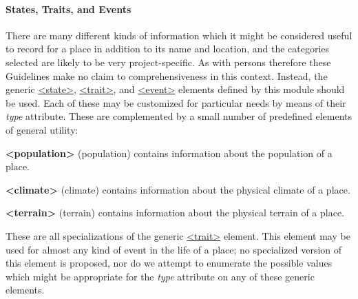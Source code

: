 \paragraph[{States, Traits, and Events}]{States, Traits, and Events}\label{NDGEOGste}\par
There are many different kinds of information which it might be considered useful to record for a place in addition to its name and location, and the categories selected are likely to be very project-specific. As with persons therefore these Guidelines make no claim to comprehensiveness in this context. Instead, the generic \hyperref[TEI.state]{<state>}, \hyperref[TEI.trait]{<trait>}, and \hyperref[TEI.event]{<event>} elements defined by this module should be used. Each of these may be customized for particular needs by means of their {\itshape type} attribute. These are complemented by a small number of predefined elements of general utility: 
\begin{sansreflist}
  
\item [\textbf{<population>}] (population) contains information about the population of a place.
\item [\textbf{<climate>}] (climate) contains information about the physical climate of a place.
\item [\textbf{<terrain>}] (terrain) contains information about the physical terrain of a place.
\end{sansreflist}
\par
These are all specializations of the generic \hyperref[TEI.trait]{<trait>} element. This element may be used for almost any kind of event in the life of a place; no specialized version of this element is proposed, nor do we attempt to enumerate the possible values which might be appropriate for the {\itshape type} attribute on any of these generic elements.\par
